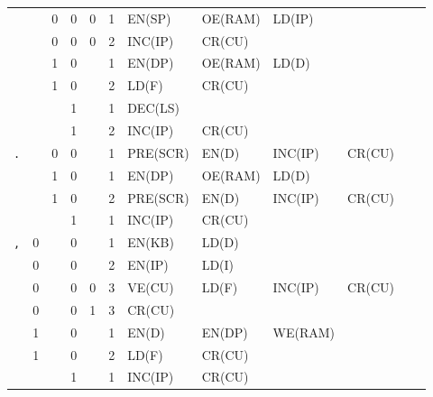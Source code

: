 \begin{longtable}[c] {c|cccc|c|llllll}
    \rowcolor{Gray}               &   & 0 & 0     & 0    & 1     & EN(SP)   & OE(RAM)  & LD(IP)  &        &        &        \\
    \rowcolor{Gray}               &   & 0 & 0     & 0    & 2     & INC(IP)  & CR(CU)   &         &        &        &        \\
    \rowcolor{White}              &   & 1 & 0     &      & 1     & EN(DP)   & OE(RAM)  & LD(D)   &        &        &        \\
    \rowcolor{White}              &   & 1 & 0     &      & 2     & LD(F)    & CR(CU)   &         &        &        &        \\
    \rowcolor{Gray}               &   &   & 1     &      & 1     & DEC(LS)  &          &         &        &        &        \\ 
    \rowcolor{Gray}               &   &   & 1     &      & 2     & INC(IP)  & CR(CU)   &         &        &        &        \\ \hline
    
    \rowcolor{Gray}  \texttt{.}   &   & 0 & 0     &      & 1     & PRE(SCR) & EN(D)    & INC(IP) & CR(CU) &        &        \\
    \rowcolor{White}              &   & 1 & 0     &      & 1     & EN(DP)   & OE(RAM)  & LD(D)   &        &        &        \\
    \rowcolor{White}              &   & 1 & 0     &      & 2     & PRE(SCR) & EN(D)    & INC(IP) & CR(CU) &        &        \\
    \rowcolor{Gray}               &   &   & 1     &      & 1     & INC(IP)  & CR(CU)   &         &        &        &        \\ \hline
    
    \rowcolor{White} \texttt{,}   & 0 &   & 0     &      & 1     & EN(KB)   & LD(D)    &         &        &        &        \\
    \rowcolor{White}              & 0 &   & 0     &      & 2     & EN(IP)   & LD(I)    &         &        &        &        \\
    \rowcolor{Gray}               & 0 &   & 0     & 0    & 3     & VE(CU)   & LD(F)    & INC(IP) & CR(CU) &        &        \\
    \rowcolor{White}              & 0 &   & 0     & 1    & 3     & CR(CU)   &          &         &        &        &        \\   
    \rowcolor{Gray}               & 1 &   & 0     &      & 1     & EN(D)    & EN(DP)   & WE(RAM) &        &        &        \\
    \rowcolor{Gray}               & 1 &   & 0     &      & 2     & LD(F)    & CR(CU)   &         &        &        &        \\
    \rowcolor{White}              &   &   & 1     &      & 1     & INC(IP)  & CR(CU)   &         &        &        &        \\ \hline
    

\end{longtable}
